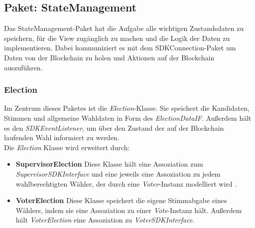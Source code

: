 \documentclass[parskip=full]{scrartcl}
\newcommand{\textitx}[1]{\mbox{\textit{#1}}}
\newcommand{\fakeparagraph}[1]{\textbf{#1}}
\begin{document}
	\subsection{Paket: StateManagement}
	Das StateManagement-Paket hat die Aufgabe alle wichtigen Zustandsdaten zu speichern, für die View zugänglich zu machen und die Logik der Daten zu implementieren.
	Dabei kommuniziert es mit dem SDKConnection-Paket um Daten von der Blockchain zu holen und Aktionen auf der Blockchain auszuführen.
	
		\subsubsection{Election}
		Im Zentrum dieses Paketes ist die \textitx{Election}-Klasse. Sie speichert die Kandidaten, Stimmen und allgemeine Wahldaten in Form des \textitx{ElectionDataIF}. Außerdem hält es den \textit{SDKEventListener}, um über den Zustand der auf
		der Blockchain laufenden Wahl informiert zu werden.\\
		Die \textitx{Election} Klasse wird erweitert durch:
		\begin{itemize}
			\item\fakeparagraph{SupervisorElection} Diese Klasse hält eine Assoziation zum \textitx{SupervisorSDKInterface} und eine jeweils eine Assoziation zu jedem wahlberechtigten Wähler, der durch eine \textit{Voter}-Instanz modelliert wird .
			\item\fakeparagraph{VoterElection} Diese Klasse speichert die eigene Stimmabgabe eines Wählers, indem sie eine Assoziation zu einer \textit{Vote}-Instanz hält. Außerdem hält  \textit{VoterElection} eine Assoziation zu \textitx{VoterSDKInterface}.
		\end{itemize}
		
\end{document}

